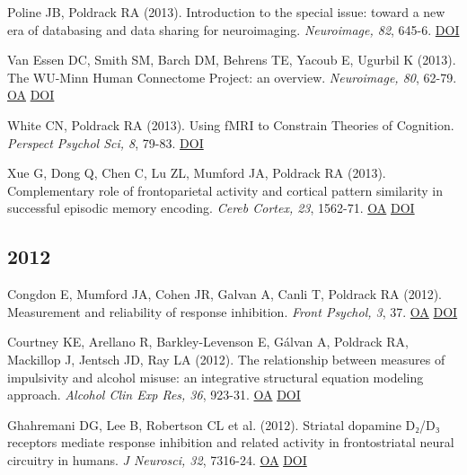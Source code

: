 \documentclass[10pt, letterpaper]{article}
\begin{document}
Poline JB, Poldrack RA (2013). Introduction to the special issue: toward a new era of databasing and data sharing for neuroimaging. \textit{Neuroimage, 82}, 645-6. \href{http://dx.doi.org/10.1016/j.neuroimage.2013.08.044}{DOI} \vspace{2mm}

Van Essen DC, Smith SM, Barch DM, Behrens TE, Yacoub E, Ugurbil K (2013). The WU-Minn Human Connectome Project: an overview. \textit{Neuroimage, 80}, 62-79. \href{https://www.ncbi.nlm.nih.gov/pmc/articles/PMC3724347}{OA} \href{http://dx.doi.org/10.1016/j.neuroimage.2013.05.041}{DOI} \vspace{2mm}

White CN, Poldrack RA (2013). Using fMRI to Constrain Theories of Cognition. \textit{Perspect Psychol Sci, 8}, 79-83. \href{http://dx.doi.org/10.1177/1745691612469029}{DOI} \vspace{2mm}

Xue G, Dong Q, Chen C, Lu ZL, Mumford JA, Poldrack RA (2013). Complementary role of frontoparietal activity and cortical pattern similarity in successful episodic memory encoding. \textit{Cereb Cortex, 23}, 1562-71. \href{https://www.ncbi.nlm.nih.gov/pmc/articles/PMC3726068}{OA} \href{http://dx.doi.org/10.1093/cercor/bhs143}{DOI} \vspace{2mm}

\subsection*{2012}Congdon E, Mumford JA, Cohen JR, Galvan A, Canli T, Poldrack RA (2012). Measurement and reliability of response inhibition. \textit{Front Psychol, 3}, 37. \href{https://www.ncbi.nlm.nih.gov/pmc/articles/PMC3283117}{OA} \href{http://dx.doi.org/10.3389/fpsyg.2012.00037}{DOI} \vspace{2mm}

Courtney KE, Arellano R, Barkley-Levenson E, Gálvan A, Poldrack RA, Mackillop J, Jentsch JD, Ray LA (2012). The relationship between measures of impulsivity and alcohol misuse: an integrative structural equation modeling approach. \textit{Alcohol Clin Exp Res, 36}, 923-31. \href{https://www.ncbi.nlm.nih.gov/pmc/articles/PMC3291799}{OA} \href{http://dx.doi.org/10.1111/j.1530-0277.2011.01635.x}{DOI} \vspace{2mm}

Ghahremani DG, Lee B, Robertson CL et al. (2012). Striatal dopamine D₂/D₃ receptors mediate response inhibition and related activity in frontostriatal neural circuitry in humans. \textit{J Neurosci, 32}, 7316-24. \href{https://www.ncbi.nlm.nih.gov/pmc/articles/PMC3517177}{OA} \href{http://dx.doi.org/10.1523/jneurosci.4284-11.2012}{DOI} \vspace{2mm}
\end{document}

